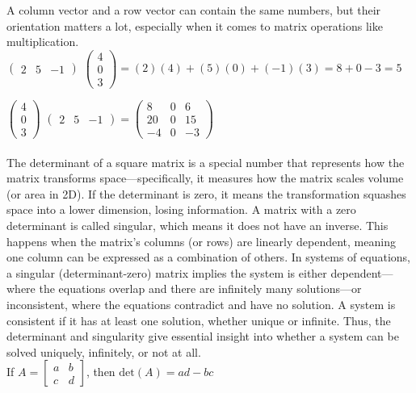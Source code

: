 \documentclass{article}
\begin{document}
A column vector and a row vector can contain the same numbers, but their orientation matters a lot, especially when it comes to matrix operations like multiplication.\\

$
\begin{pmatrix}
2 & 5 & -1
\end{pmatrix}
$
$
\begin{pmatrix}
4\\
0\\
3
\end{pmatrix}
=
(2)(4) + (5)(0) + (-1)(3) = 8 + 0 - 3 = 5
$

$
\begin{pmatrix}
4\\
0\\
3
\end{pmatrix}
$
$
\begin{pmatrix}
2 & 5 & -1
\end{pmatrix}
=
\begin{pmatrix}
8 & 0 & 6\\
	20 & 0 & 15\\
-4 & 0 & -3
\end{pmatrix}
$\\\\

The determinant of a square matrix is a special number that represents how the matrix transforms space—specifically, it measures how the matrix scales volume (or area in 2D). If the determinant is zero, it means the transformation squashes space into a lower dimension, losing information. A matrix with a zero determinant is called singular, which means it does not have an inverse. This happens when the matrix’s columns (or rows) are linearly dependent, meaning one column can be expressed as a combination of others. In systems of equations, a singular (determinant-zero) matrix implies the system is either dependent—where the equations overlap and there are infinitely many solutions—or inconsistent, where the equations contradict and have no solution. A system is consistent if it has at least one solution, whether unique or infinite. Thus, the determinant and singularity give essential insight into whether a system can be solved uniquely, infinitely, or not at all.\\

If
$ A = 
\begin{bmatrix}
a & b\\
c & d
\end{bmatrix}
$, then $\text{det}(A) = ad - bc$\\
\end{document}
